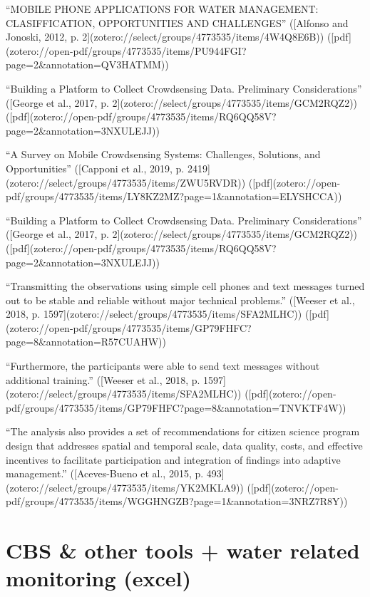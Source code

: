 {“MOBILE PHONE APPLICATIONS FOR WATER MANAGEMENT: CLASIFFICATION, OPPORTUNITIES AND CHALLENGES” ([Alfonso and Jonoski, 2012, p. 2](zotero://select/groups/4773535/items/4W4Q8E6B)) ([pdf](zotero://open-pdf/groups/4773535/items/PU944FGI?page=2&annotation=QV3HATMM))

“Building a Platform to Collect Crowdsensing Data. Preliminary Considerations” ([George et al., 2017, p. 2](zotero://select/groups/4773535/items/GCM2RQZ2)) ([pdf](zotero://open-pdf/groups/4773535/items/RQ6QQ58V?page=2&annotation=3NXULEJJ))

“A Survey on Mobile Crowdsensing Systems: Challenges, Solutions, and Opportunities” ([Capponi et al., 2019, p. 2419](zotero://select/groups/4773535/items/ZWU5RVDR)) ([pdf](zotero://open-pdf/groups/4773535/items/LY8KZ2MZ?page=1&annotation=ELYSHCCA))

“Building a Platform to Collect Crowdsensing Data. Preliminary Considerations” ([George et al., 2017, p. 2](zotero://select/groups/4773535/items/GCM2RQZ2)) ([pdf](zotero://open-pdf/groups/4773535/items/RQ6QQ58V?page=2&annotation=3NXULEJJ))

“Transmitting the observations using simple cell phones and text messages turned out to be stable and reliable without major technical problems.” ([Weeser et al., 2018, p. 1597](zotero://select/groups/4773535/items/SFA2MLHC)) ([pdf](zotero://open-pdf/groups/4773535/items/GP79FHFC?page=8&annotation=R57CUAHW))

“Furthermore, the participants were able to send text messages without additional training.” ([Weeser et al., 2018, p. 1597](zotero://select/groups/4773535/items/SFA2MLHC)) ([pdf](zotero://open-pdf/groups/4773535/items/GP79FHFC?page=8&annotation=TNVKTF4W))

“The analysis also provides a set of recommendations for citizen science program design that addresses spatial and temporal scale, data quality, costs, and effective incentives to facilitate participation and integration of findings into adaptive management.” ([Aceves-Bueno et al., 2015, p. 493](zotero://select/groups/4773535/items/YK2MKLA9)) ([pdf](zotero://open-pdf/groups/4773535/items/WGGHNGZB?page=1&annotation=3NRZ7R8Y))



\section{CBS & other tools + water related monitoring (excel)}

}
